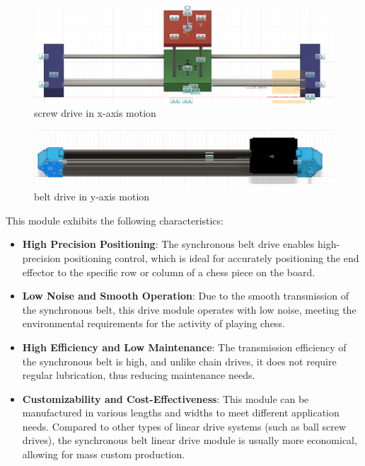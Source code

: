 \documentclass[10pt, a4paper, twocolumn]{article}
\begin{document}
\begin{figure}
    \centering
    \includegraphics[width=0.8\linewidth]{screw drive in x-axis motion.png}
    \caption{screw drive in x-axis motion}
    \label{fig:screw drive in x-axis motion}
\end{figure}

\begin{figure}
    \centering
    \includegraphics[width=0.8\linewidth]{belt drive in y-axis motion.png}
    \caption{belt drive in y-axis motion}
    \label{fig:belt drive in y-axis motion}
\end{figure}

This module exhibits the following characteristics:

\begin{itemize}
    \item \textbf{High Precision Positioning}: The synchronous belt drive enables high-precision positioning control, which is ideal for accurately positioning the end effector to the specific row or column of a chess piece on the board.
    \item \textbf{Low Noise and Smooth Operation}: Due to the smooth transmission of the synchronous belt, this drive module operates with low noise, meeting the environmental requirements for the activity of playing chess.
    \item \textbf{High Efficiency and Low Maintenance}: The transmission efficiency of the synchronous belt is high, and unlike chain drives, it does not require regular lubrication, thus reducing maintenance needs.
    \item \textbf{Customizability and Cost-Effectiveness}: This module can be manufactured in various lengths and widths to meet different application needs. Compared to other types of linear drive systems (such as ball screw drives), the synchronous belt linear drive module is usually more economical, allowing for mass custom production.
\end{itemize}
\end{document}
